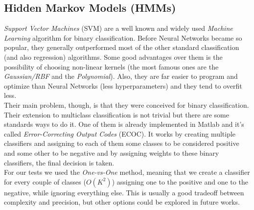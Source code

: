 \subsection{Hidden Markov Models (HMMs)}
\label{subsec:hmm}

\textit{Support Vector Machines} (SVM) are a well known and widely used \textit{Machine Learning} algorithm for binary classification. Before Neural Networks became so popular, they generally outperformed most of the other standard classification (and also regression) algorithms. Some good advantages over them is the possibility of choosing non-linear kernels (the most famous ones are the \textit{Gaussian/RBF} and the \textit{Polynomial}). Also, they are far easier to program and optimize than Neural Networks (less hyperparameters) and they tend to overfit less.\\
%
Their main problem, though, is that they were conceived for binary classification. Their extension to multiclass classification is not trivial but there are some standards ways to do it. One of them is already implemented in Matlab and it's called \textit{Error-Correcting Output Codes} (ECOC). It works by creating multiple classifiers and assigning to each of them some classes to be considered positive and some other to be negative and by assigning weights to these binary classifiers, the final decision is taken.\\
%
For our tests we used the \textit{One-vs-One} method, meaning that we create a classifier for every couple of classes ($O(K^2)$) assigning one to the positive and one to the negative, while ignoring everything else. This is usually a good tradeoff between complexity and precision, but other options could be explored in future works.